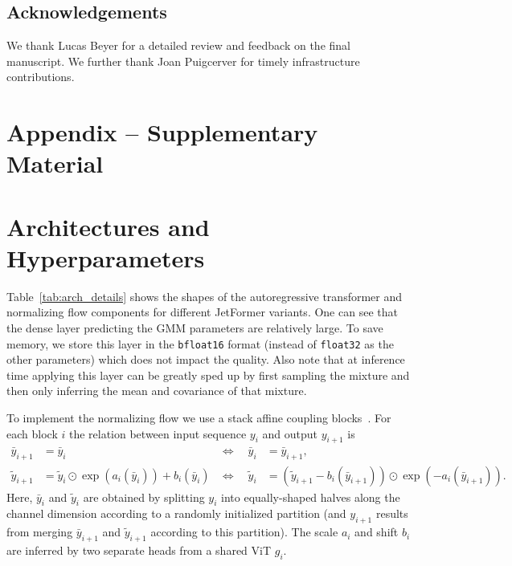 \documentclass{article} %
\newcommand{\name}{JetFormer\xspace}
\begin{document}
\subsection*{Acknowledgements} We thank Lucas Beyer for a detailed review and feedback on the final manuscript. We further thank Joan Puigcerver for timely infrastructure contributions.





\clearpage
\appendix
\section*{Appendix -- Supplementary Material}
\FloatBarrier %

\section{Architectures and Hyperparameters}
\label{app:architecture}
Table~\ref{tab:arch_details} shows the shapes of the autoregressive transformer and normalizing flow components for different \name variants. One can see that the dense layer predicting the GMM parameters are relatively large. To save memory, we store this layer in the \texttt{bfloat16} format (instead of \texttt{float32} as the other parameters) which does not impact the quality. Also note that at inference time applying this layer can be greatly sped up by first sampling the mixture and then only inferring the mean and covariance of that mixture.

To implement the normalizing flow we use a stack affine coupling blocks~\cite[Eqn.~7,~8]{dinh2016density}. For each block $i$ the relation between input sequence $y_i$ and output $y_{i+1}$ is
\begin{align*}
    \bar y_{i+1} &= \bar y_i
    &\Leftrightarrow \quad \bar y_i &= \bar y_{i+1},\\
    \tilde y_{i+1} &= \tilde y_i \odot \exp(a_i(\bar y_i)) + b_i(\bar y_i) &\Leftrightarrow \quad \tilde y_i &= (\tilde y_{i+1} - b_i(\bar y_{i+1})) \odot \exp(-a_i(\bar y_{i+1})).
\end{align*}
Here, $\bar y_i$ and $\tilde y_i$ are obtained by splitting $y_i$ into equally-shaped halves along the channel dimension according to a randomly initialized partition (and $y_{i+1}$ results from merging $\bar y_{i+1}$ and $\tilde y_{i+1}$ according to this partition). The scale $a_i$ and shift $b_i$ are inferred by two separate heads from a shared ViT $g_i$.
\end{document}
